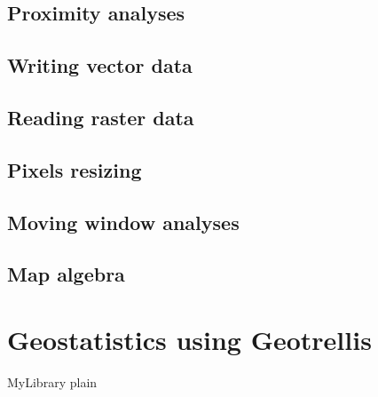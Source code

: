 \documentclass {article}
\begin{document}
\subsection {Proximity analyses}

\subsection {Writing vector data}

\subsection {Reading raster data}

\subsection {Pixels resizing}

\subsection {Moving window analyses}

\subsection {Map algebra}



\section {Geostatistics using Geotrellis}

 {MyLibrary}
 {plain}
\end{document}

